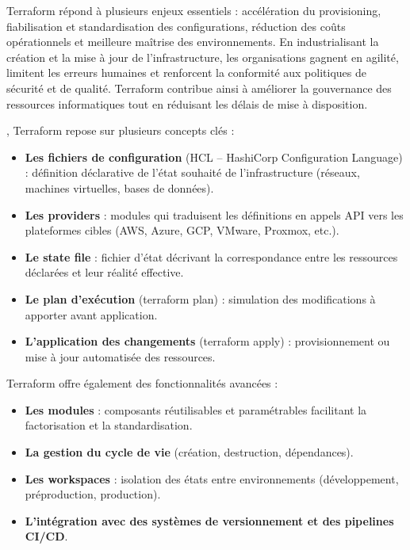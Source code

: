  Terraform répond à plusieurs enjeux essentiels  : accélération du provisioning, fiabilisation et standardisation des configurations, réduction des coûts opérationnels et meilleure maîtrise des environnements. En industrialisant la création et la mise à jour de l’infrastructure, les organisations gagnent en agilité, limitent les erreurs humaines et renforcent la conformité aux politiques de sécurité et de qualité. Terraform contribue ainsi à améliorer la gouvernance des ressources informatiques tout en réduisant les délais de mise à disposition.

, Terraform repose sur plusieurs concepts clés :
\begin{itemize}
	\item \textbf{Les fichiers de configuration} (HCL – HashiCorp Configuration Language)  : définition déclarative de l’état souhaité de l’infrastructure (réseaux, machines virtuelles, bases de données).
	\item \textbf{Les providers}  : modules qui traduisent les définitions en appels API vers les plateformes cibles (AWS, Azure, GCP, VMware, Proxmox, etc.).
	\item \textbf{Le state file}  : fichier d’état décrivant la correspondance entre les ressources déclarées et leur réalité effective.
	\item \textbf{Le plan d’exécution} (terraform plan)  : simulation des modifications à apporter avant application.
	\item \textbf{L’application des changements} (terraform apply)  : provisionnement ou mise à jour automatisée des ressources.
\end{itemize}

Terraform offre également des fonctionnalités avancées  :
\begin{itemize}
	\item \textbf{Les modules}  : composants réutilisables et paramétrables facilitant la factorisation et la standardisation.
	\item \textbf{La gestion du cycle de vie} (création, destruction, dépendances).
	\item \textbf{Les workspaces}  : isolation des états entre environnements (développement, préproduction, production).
	\item \textbf{L’intégration avec des systèmes de versionnement et des pipelines CI/CD}.
\end{itemize}

